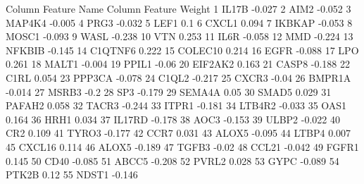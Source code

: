 \documentclass{article}\usepackage[]{graphicx}\usepackage[]{color}
\begin{document}
\begin{Schunk}
\begin{Soutput}
   Column Feature Name Column Feature Weight
1  IL17B               -0.027               
2  AIM2                -0.052               
3  MAP4K4              -0.005               
4  PRG3                -0.032               
5  LEF1                0.1                  
6  CXCL1               0.094                
7  IKBKAP              -0.053               
8  MOSC1               -0.093               
9  WASL                -0.238               
10 VTN                 0.253                
11 IL6R                -0.058               
12 MMD                 -0.224               
13 NFKBIB              -0.145               
14 C1QTNF6             0.222                
15 COLEC10             0.214                
16 EGFR                -0.088               
17 LPO                 0.261                
18 MALT1               -0.004               
19 PPIL1               -0.06                
20 EIF2AK2             0.163                
21 CASP8               -0.188               
22 C1RL                0.054                
23 PPP3CA              -0.078               
24 C1QL2               -0.217               
25 CXCR3               -0.04                
26 BMPR1A              -0.014               
27 MSRB3               -0.2                 
28 SP3                 -0.179               
29 SEMA4A              0.05                 
30 SMAD5               0.029                
31 PAFAH2              0.058                
32 TACR3               -0.244               
33 ITPR1               -0.181               
34 LTB4R2              -0.033               
35 OAS1                0.164                
36 HRH1                0.034                
37 IL17RD              -0.178               
38 AOC3                -0.153               
39 ULBP2               -0.022               
40 CR2                 0.109                
41 TYRO3               -0.177               
42 CCR7                0.031                
43 ALOX5               -0.095               
44 LTBP4               0.007                
45 CXCL16              0.114                
46 ALOX5               -0.189               
47 TGFB3               -0.02                
48 CCL21               -0.042               
49 FGFR1               0.145                
50 CD40                -0.085               
51 ABCC5               -0.208               
52 PVRL2               0.028                
53 GYPC                -0.089               
54 PTK2B               0.12                 
55 NDST1               -0.146               
\end{Soutput}
\end{Schunk}
\end{document}
